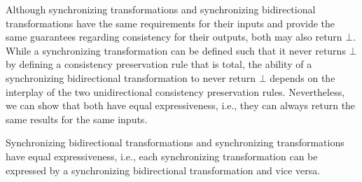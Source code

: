 Although synchronizing transformations and synchronizing bidirectional transformations have the same requirements for their inputs and provide the same guarantees regarding consistency for their outputs, both may also return $\bot$.
While a synchronizing transformation can be defined such that it never returns $\bot$ by defining a consistency preservation rule that is total, the ability of a synchronizing bidirectional transformation to never return $\bot$ depends on the interplay of the two unidirectional consistency preservation rules.
Nevertheless, we can show that both have equal expressiveness, i.e., they can always return the same results for the same inputs.

\begin{theorem}
    Synchronizing bidirectional transformations and synchronizing transformations have equal expressiveness, i.e., each synchronizing transformation can be expressed by a synchronizing bidirectional transformation and vice versa.
\end{theorem}
